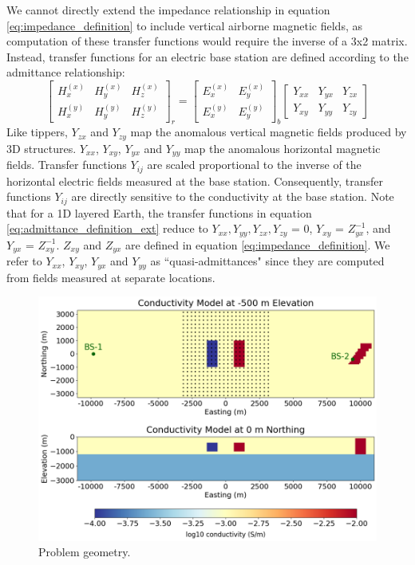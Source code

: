 \documentclass{segabs}
\begin{document}
We cannot directly extend the impedance relationship in equation \ref{eq:impedance_definition} to include vertical airborne magnetic fields, as computation of these transfer functions would require the inverse of a 3x2 matrix. Instead, transfer functions for an electric base station are defined according to the admittance relationship:
\begin{equation}
\label{eq:admittance_definition_ext}
\begin{bmatrix} \! H_x^{(x)} & \! H_y^{(x)} & \! H_z^{(x)} \\ \! H_x^{(y)} & \! H_y^{(y)} & \! H_z^{(y)} \end{bmatrix}_r \!\!\!\! = \!
\begin{bmatrix} \! E_x^{(x)} & \! E_y^{(x)} \\ \! E_x^{(y)} & \! E_y^{(y)} \end{bmatrix}_b
\begin{bmatrix} \! Y_{xx} & \! Y_{yx} & \! Y_{zx} \\ \! Y_{xy} & \! Y_{yy} & \! Y_{zy} \end{bmatrix}
\end{equation}
Like tippers, $Y_{zx}$ and $Y_{zy}$ map the anomalous vertical magnetic fields produced by 3D structures. $Y_{xx}$, $Y_{xy}$, $Y_{yx}$ and $Y_{yy}$ map the anomalous horizontal magnetic fields. Transfer functions $Y_{ij}$ are scaled proportional to the inverse of the horizontal electric fields measured at the base station. Consequently, transfer functions $Y_{ij}$ are directly sensitive to the conductivity at the base station. Note that for a 1D layered Earth, the transfer functions in equation \ref{eq:admittance_definition_ext} reduce to $Y_{xx}, Y_{yy}, Y_{zx}, Y_{zy}$ = 0, $Y_{xy}$ = $Z_{yx}^{-1}$, and $Y_{yx}$ = $Z_{xy}^{-1}$. $Z_{xy}$ and $Z_{yx}$ are defined in equation \ref{eq:impedance_definition}. We refer to $Y_{xx}$, $Y_{xy}$, $Y_{yx}$ and $Y_{yy}$ as ``quasi-admittances" since they are computed from fields measured at separate locations.
\begin{figure}[b!]
\centering
\vspace{-10pt}
\includegraphics[width=\columnwidth]{images/geology.png}
\vspace{-20pt}
\caption{Problem geometry.}
\label{fig:geology}
\vspace{-5pt}
\end{figure}
\end{document}
